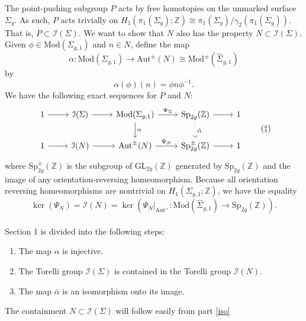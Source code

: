 \documentclass[a4paper]{amsproc}
\theoremstyle{TheoremNum}
\theoremstyle{Theorembold}
\theoremstyle{TheoremboldDef}
\theoremstyle{TheoremboldRem}
\theoremstyle{TheoremboldRem}
\begin{document}
 The point-pushing subgroup $P$ acts by free homotopies on the unmarked surface $\Sigma_g$. As such, $P$ acts trivially on $H_1({\pi_1(\Sigma_g)};{\mathbb{Z}})\cong {\pi_1(\Sigma_g)}/\gamma_2({\pi_1(\Sigma_g)})$. That is, $P\subset{{\mathcal{I}}(\Sigma)}$. We want to show that $N$ also has the property $N\subset{{\mathcal{I}}(\Sigma)}$.\\

Given $\phi\in{\text{Mod}(\Sigma_{g,1})}$ and $n\in N$, define the map \[{\alpha}:{\text{Mod}(\Sigma_{g,1})}\to\text{Aut}^\pm(N)\cong {\text{Mod}^\pm(\hat{\Sigma}_{g,1})}\] by \[{\alpha}(\phi)(n)=\phi n \phi^{-1}.\] We have the following exact sequences for $P$ and $N$:
 \[
\begin{tikzcd}
1 \arrow{r}{}  & {{\mathcal{I}}(\Sigma)} \arrow{r}{} & {\text{Mod}(\Sigma_{g,1})} \arrow{d}{\alpha} \arrow{r}{\Psi_\Sigma} & {\text{Sp}_{2g}({\mathbb{Z}})}\arrow[dotted]{d}{\bar{\alpha}} \arrow{r} & 1\\
1 \arrow{r}{} & {{\mathcal{I}}(N)}\arrow{r} & \text{Aut}^\pm(N) \arrow{r}{\Psi_N} & {\text{Sp}_{2g}^{\pm}({\mathbb{Z}})}\arrow{r} & 1
\end{tikzcd}\tag{$\ddagger$}
\]
where ${\text{Sp}_{2g}^{\pm}({\mathbb{Z}})}$ is the subgroup of ${\text{GL}_{2g}({\mathbb{Z}})}$ generated by ${\text{Sp}_{2g}({\mathbb{Z}})}$ and the image of any orientation-reversing homeomorphism. Because all orientation reversing homeomorphisms are nontrivial on $H_1(\Sigma_{g,1};{\mathbb{Z}})$, we have the equality
\[\ker(\Psi_N)={{\mathcal{I}}(N)}= \ker(\Psi_N|_{\text{Aut}^{+}}:{\text{Mod}(\hat{\Sigma}_{g,1})}\to{\text{Sp}_{2g}({\mathbb{Z}})}).\] \\
Section 1 is divided into the following steps: \\

\begin{enumerate}[label=1.\Alph*.]
 \item\label{injective} The map ${\alpha}$ is injective.\\

\item\label{kernels} The Torelli group ${{\mathcal{I}}(\Sigma)}$ is contained in the Torelli group ${{\mathcal{I}}(N)}$.\\
 
\item\label{iso} The map $\bar{\alpha}$ is an isomorphism onto its image.\\
\end{enumerate}
The containment $N\subset{{\mathcal{I}}(\Sigma)}$ will follow easily from part \ref{iso}\\
\end{document}

